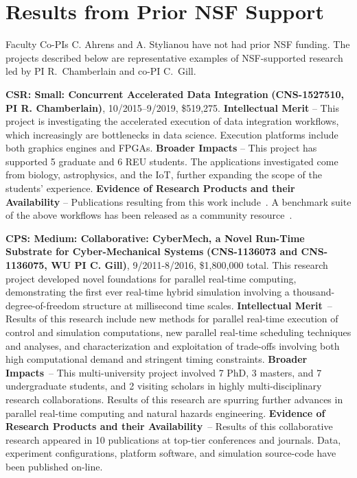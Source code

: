 \section{Results from Prior NSF Support}
\label{sec:prior}

Faculty Co-PIs C. Ahrens and A. Stylianou have not had prior NSF funding.
The projects described
below are representative examples of NSF-supported research led by PI 
R.~Chamberlain and co-PI C.~Gill.

{\large\bf CSR: Small: Concurrent Accelerated Data Integration}
{\bf (CNS-1527510,
PI R. Chamberlain)}, 
10/2015--9/2019, \$519,275.  
%
\textbf{Intellectual Merit} -- This project is investigating the
accelerated execution of data integration workflows, which
increasingly are bottlenecks in data science. Execution platforms
include both graphics engines and FPGAs.
%
\textbf{Broader Impacts} -- This project has supported 5
graduate and 6 REU students.  The applications investigated
come from biology, astrophysics, and the IoT,
further expanding the scope of the students'
experience.
%
\textbf{Evidence of Research Products and their Availability} --
Publications resulting from this work include~\cite{cc19,dibs,c17,fcbmc19,mgc16,js16}.
A benchmark suite of the above workflows has been released
as a community resource~\cite{dibsv1}.

{\large\bf CPS: Medium: Collaborative: CyberMech, a Novel Run-Time Substrate for 
Cyber-Mechanical Systems}
{\bf (CNS-1136073 and CNS-1136075,
WU PI C. Gill)}, 9/2011-8/2016, \$1,800,000 total.  
%
This research project developed novel foundations for parallel real-time computing, demonstrating the first ever real-time hybrid simulation involving a thousand-degree-of-freedom structure at millisecond time scales.
%
\textbf{Intellectual Merit}~-- Results of this research include new methods for parallel real-time execution of control and simulation computations, new parallel real-time scheduling techniques and analyses, and characterization and exploitation of trade-offs involving both high computational demand and stringent timing constraints.
%
\textbf{Broader Impacts}~-- This multi-university project involved 7 PhD, 3 masters, and 7 undergraduate students, and 2 visiting scholars in highly multi-disciplinary research collaborations.  Results of this research are spurring
further advances in parallel real-time computing and natural hazards
engineering.
%
\textbf{Evidence of Research Products and their Availability}~-- Results of
this 
collaborative research appeared in 10 publications at
top-tier conferences and journals.
Data, experiment configurations, platform software, and simulation source-code 
have been published on-line. %

